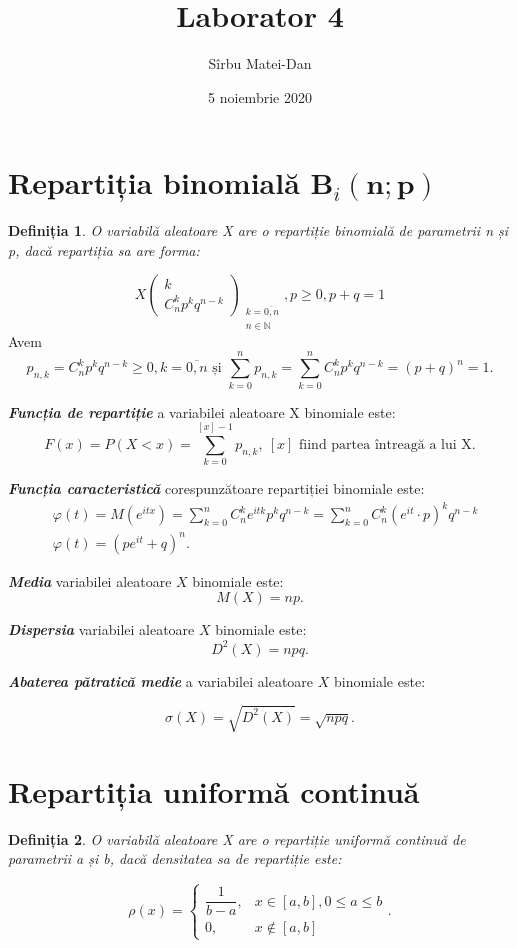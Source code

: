 \documentclass[9pt,a4paper]{article}
\title{\bf Laborator 4}
\author{Sîrbu Matei-Dan}
\date{5 noiembrie 2020}
\newtheorem*{definitie}{Definiția}
\begin{document}
\maketitle

\section*{Repartiția binomială $\mathbf{B}_i(\mathbf{n;p})$}

\begin{definitie}O variabilă aleatoare X are o repartiție binomială de parametrii n și p, dacă repartiția sa are forma:
\end{definitie}
$$X\begin{pmatrix}
    k \\ C_n^k p^k q^{n-k} 
\end{pmatrix}_{\substack{k=\overline{0,n} \\ n \in \mathbb{N}}}, p \geq 0, p + q = 1$$
Avem
    $$p_{n, k} = C_n^k p^k q^{n-k} \geq 0, k = \overline{0, n} \text{ și } \sum_{k=0}^n {p_{n,k}} = \sum_{k=0}^n{C_n^k p^k q^{n-k}} = (p + q)^n = 1.$$ 

\textbf{\textit{Funcția de repartiție}} a variabilei aleatoare X binomiale este:
    $$F(x) = P(X < x) = \sum_{k=0}^{[x]-1}{p_{n,k},\ [x] \text{ fiind partea întreagă a lui X.}}$$

\textbf{\textit{Funcția caracteristică}} corespunzătoare repartiției binomiale este:
\begin{align*}
&\varphi(t) = M(e^{itx}) = \sum_{k=0}^n{C_n^k e^{itk} p^k q^{n-k}} = \sum_{k=0}^n{C_n^k (e^{it} \cdot p)^k q^{n-k}} \\ 
&\varphi(t) = (pe^{it} + q)^n.
\end{align*}

\textbf{\textit{Media}} variabilei aleatoare $X$ binomiale este:
$$M(X) = np.$$

\textbf{\textit{Dispersia}} variabilei aleatoare $X$ binomiale este:
$$D^2(X) = npq.$$

\textbf{\textit{Abaterea pătratică medie}} a variabilei aleatoare $X$ binomiale este:

$$\sigma(X) = \sqrt{D^2(X)} = \sqrt{npq}.$$

\newpage

\section*{Repartiția uniformă continuă}
\begin{definitie}
O variabilă aleatoare X are o repartiție uniformă continuă de parametrii a și b, dacă densitatea sa de repartiție este:
\end{definitie}
$$\rho(x) = 
\begin{cases}
    \dfrac{1}{b - a}, &x \in [a, b], 0 \leq a \leq b \\ 0, &x \notin [a, b]
\end{cases}.$$
\end{document}
